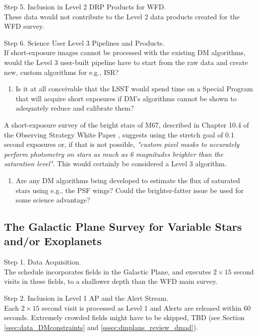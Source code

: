 \documentclass[DM,lsstdraft,toc]{lsstdoc}
\begin{document}
Step 5. Inclusion in Level 2 DRP Products for WFD. \\
These data would not contribute to the Level 2 data products created for the WFD survey.

Step 6. Science User Level 3 Pipelines and Products. \\
If short-exposure images cannot be processed with the existing DM algorithms, would the Level 3 user-built pipeline have to start from the raw data and create new, custom algorithms for e.g., ISR? 
\begin{enumerate}[resume,topsep=-10pt,label= \textbf{Concern \Roman*.}] \item \label{SPCS-3} Is it at all conceivable that the LSST would spend time on a Special Program that will acquire short exposures if DM's algorithms cannot be shown to adequately reduce and calibrate them? \end{enumerate}
A short-exposure survey of the bright stars of M67, described in Chapter 10.4 of the Observing Strategy White Paper \cite{2017arXiv170804058L}, suggests using the stretch goal of 0.1 second exposures or, if that is not possible, {\it "custom pixel masks to accurately perform photometry on stars as much as 6 magnitudes brighter than the saturation level"}. This would certainly be considered a Level 3 algorithm.
\begin{enumerate}[resume,topsep=-10pt,label= \textbf{Concern \Roman*.}] \item \label{SPCS-4} Are any DM algorithms being developed to estimate the flux of saturated stars using e.g., the PSF wings? Could the brighter-fatter issue be used for some science advantage? \end{enumerate}



\subsection{The Galactic Plane Survey for Variable Stars and/or Exoplanets}\label{ssec:SPCS_GPVSEx}

Step 1. Data Acquisition. \\
The schedule incorporates fields in the Galactic Plane, and executes $2\times15$ second visits in these fields, to a shallower depth than the WFD main survey. 

Step 2. Inclusion in Level 1 AP and the Alert Stream. \\
Each $2\times15$ second visit is processed as Level 1 and Alerts are released within 60 seconds. Extremely crowded fields might have to be skipped, TBD (see Section \ref{ssec:data_DMconstraints} and \ref{sssec:dmplans_review_dmad}).
\end{document}
